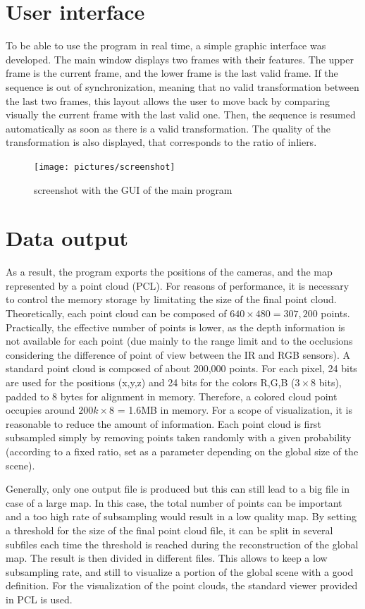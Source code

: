 \clearpage
\section{User interface}
To be able to use the program in real time, a simple graphic interface was developed. The main window displays two frames with their features. The upper frame is the current frame, and the lower frame is the last valid frame. If the sequence is out of synchronization, meaning that no valid transformation between the last two frames, this layout allows the user to move back by comparing visually the current frame with the last valid one. Then, the sequence is resumed automatically as soon as there is a valid transformation. The quality of the transformation is also displayed, that corresponds to the ratio of inliers.
\begin{figure}[H]
\centering
\texttt{[image: pictures/screenshot]}\\
\caption{screenshot with the GUI of the main program}
\end{figure}

\clearpage
\section{Data output}
\label{sec:data_output}

As a result, the program exports the positions of the cameras, and the map represented by a point cloud (\gls{PCL}). For reasons of performance, it is necessary to control the memory storage by limitating the size of the final point cloud. Theoretically, each point cloud can be composed of $640\times480 = 307,200$ points. Practically, the effective number of points is lower, as the depth information is not available for each point (due mainly to the range limit and to the occlusions considering the difference of point of view between the IR and RGB sensors). A standard point cloud is composed of about 200,000 points. For each pixel, 24 bits are used for the positions (x,y,z) and 24 bits for the colors R,G,B ($3\times8$ bits), padded to 8 bytes for alignment in memory. Therefore, a colored cloud point occupies around $200k\times8$ = 1.6MB in memory. For a scope of visualization, it is reasonable to reduce the amount of information. Each point cloud is first subsampled simply by removing points taken randomly with a given probability (according to a fixed ratio, set as a parameter depending on the global size of the scene).

Generally, only one output file is produced but this can still lead to a big file in case of a large map. In this case, the total number of points can be  important and a too high rate of subsampling would result in a low quality map. By setting a threshold for the size of the final point cloud file, it can be split in several subfiles each time the threshold is reached during the reconstruction of the global map. The result is then divided in different files. This allows to keep a low subsampling rate, and still to visualize a portion of the global scene with a good definition. For the visualization of the point clouds, the standard viewer provided in \gls{PCL} is used.


